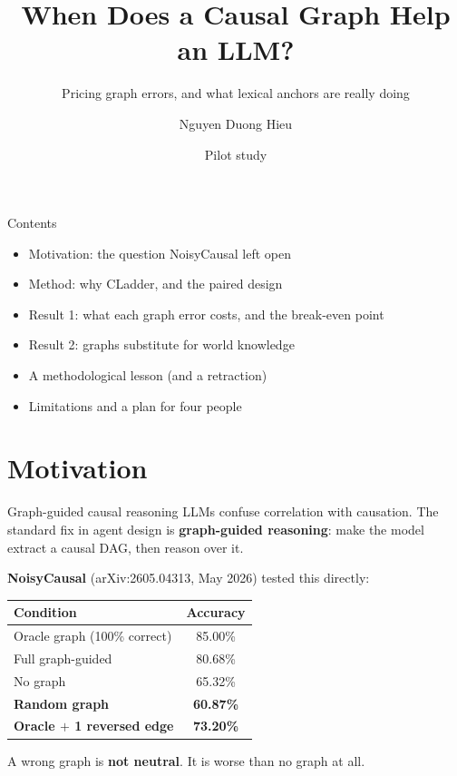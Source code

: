 \documentclass{beamer}
\title{When Does a Causal Graph Help an LLM?}
\subtitle{Pricing graph errors, and what lexical anchors are really doing}
\author{Nguyen Duong Hieu}
\date{Pilot study}
\begin{document}
\maketitle

\begin{frame}{Contents}
  \begin{itemize}
    \item Motivation: the question NoisyCausal left open
    \item Method: why CLadder, and the paired design
    \item Result 1: what each graph error costs, and the break-even point
    \item Result 2: graphs substitute for world knowledge
    \item A methodological lesson (and a retraction)
    \item Limitations and a plan for four people
  \end{itemize}
\end{frame}

\section{Motivation}
\begin{frame}
  \sectionpage
\end{frame}

\begin{frame}{Graph-guided causal reasoning}
  LLMs confuse correlation with causation. The standard fix in agent design is
  \textbf{graph-guided reasoning}: make the model extract a causal DAG, then
  reason over it.

  \vspace{0.4cm}
  \textbf{NoisyCausal} (arXiv:2605.04313, May 2026) tested this directly:

  \begin{center}
  \begin{tabular}{lc}
    \toprule
    Condition & Accuracy \\
    \midrule
    Oracle graph (100\% correct)      & 85.00\% \\
    Full graph-guided                 & 80.68\% \\
    No graph                          & 65.32\% \\
    \textbf{Random graph}             & \textbf{60.87\%} \\
    \textbf{Oracle $+$ 1 reversed edge} & \textbf{73.20\%} \\
    \bottomrule
  \end{tabular}
  \end{center}

  \vspace{0.3cm}
  A wrong graph is \textbf{not neutral}. It is worse than no graph at all.
\end{frame}
\end{document}
